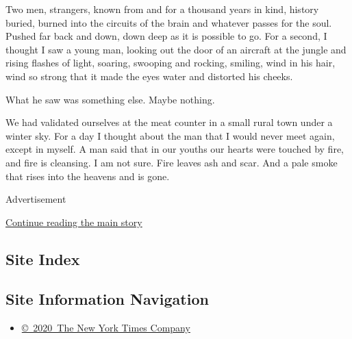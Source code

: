 Two men, strangers, known from and for a thousand years in kind, history
buried, burned into the circuits of the brain and whatever passes for
the soul. Pushed far back and down, down deep as it is possible to go.
For a second, I thought I saw a young man, looking out the door of an
aircraft at the jungle and rising flashes of light, soaring, swooping
and rocking, smiling, wind in his hair, wind so strong that it made the
eyes water and distorted his cheeks.

What he saw was something else. Maybe nothing.

We had validated ourselves at the meat counter in a small rural town
under a winter sky. For a day I thought about the man that I would never
meet again, except in myself. A man said that in our youths our hearts
were touched by fire, and fire is cleansing. I am not sure. Fire leaves
ash and scar. And a pale smoke that rises into the heavens and is gone.

Advertisement

\protect\hyperlink{after-bottom}{Continue reading the main story}

\hypertarget{site-index}{%
\subsection{Site Index}\label{site-index}}

\hypertarget{site-information-navigation}{%
\subsection{Site Information
Navigation}\label{site-information-navigation}}

\begin{itemize}
\tightlist
\item
  \href{https://help.nytimes3xbfgragh.onion/hc/en-us/articles/115014792127-Copyright-notice}{©~2020~The
  New York Times Company}
\end{itemize}


